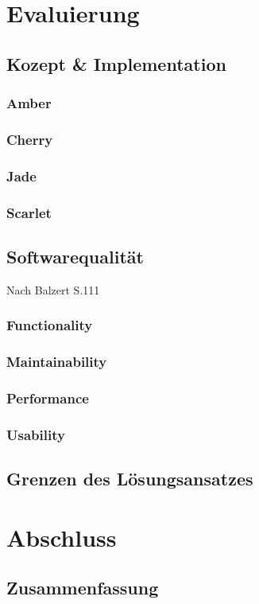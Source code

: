 \documentclass[12pt,oneside,a4paper,parskip]{scrbook}
\begin{document}
\chapter{Evaluierung}
\section{Kozept \& Implementation}
\subsection{Amber}
\subsection{Cherry}
\subsection{Jade}
\subsection{Scarlet}
\section{Softwarequalität}
Nach Balzert S.111
\subsection{Functionality}
\subsection{Maintainability}
\subsection{Performance}
\subsection{Usability}
\section{Grenzen des Lösungsansatzes}

\chapter{Abschluss}
\section{Zusammenfassung}
\end{document}
